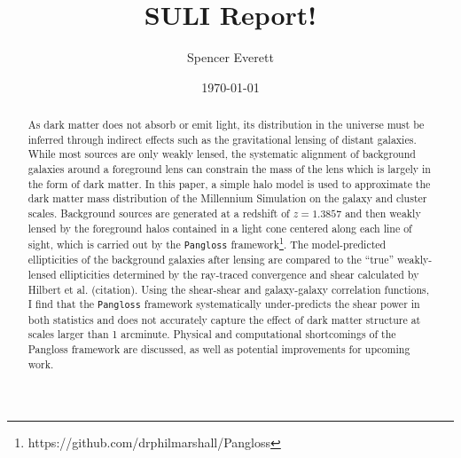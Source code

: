 \documentclass[%
 reprint,
 amsmath,amssymb,
 aps,
]{revtex4-1}
\begin{document}

\title{SULI Report!}

\author{Spencer Everett}


\date{\today}

\begin{abstract}
As dark matter does not absorb or emit light, its distribution in the universe must be inferred through indirect effects such as the gravitational lensing of distant galaxies. While most sources are only weakly lensed, the systematic alignment of background galaxies around a foreground lens can constrain the mass of the lens which is largely in the form of dark matter. In this paper, a simple halo model is used to approximate the dark matter mass distribution of the Millennium Simulation on the galaxy and cluster scales. Background sources are generated at a redshift of ${z = 1.3857}$ and then weakly lensed by the foreground halos contained in a light cone centered along each line of sight, which is carried out by the \texttt{Pangloss} framework\footnote{https://github.com/drphilmarshall/Pangloss}. The model-predicted ellipticities of the background galaxies after lensing are compared to the ``true'' weakly-lensed ellipticities determined by the ray-traced convergence and shear calculated by Hilbert et al. (citation). Using the shear-shear and galaxy-galaxy correlation functions, I find that the \texttt{Pangloss} framework systematically under-predicts the shear power in both statistics and does not accurately capture the effect of dark matter structure at scales larger than 1 arcminute. Physical and computational shortcomings of the Pangloss framework are discussed, as well as potential improvements for upcoming work.
\end{abstract}

\maketitle
\end{document}
